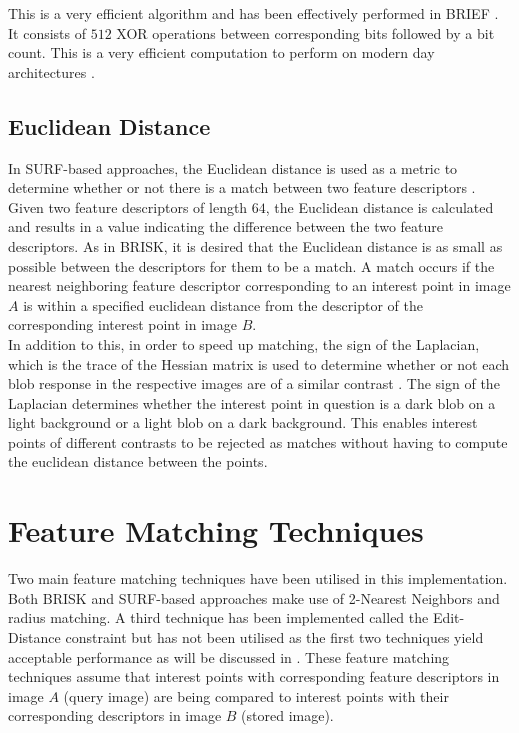 \documentclass{report}
\begin{document}
This is a very efficient algorithm and has been effectively performed in BRIEF \cite{Calonder}. It consists of $512$ XOR operations between corresponding bits followed by a bit count. This is a very efficient computation to perform on modern day architectures \cite{Leutenegger2011}. \\ 

\subsection{Euclidean Distance}
\label{sec:euclidean}
In SURF-based approaches,  the Euclidean distance is used as a metric to determine whether or not there is a match between two feature descriptors \cite{Lowe2004}. Given two feature descriptors of length $64$, the Euclidean distance is calculated and results in a value indicating the difference between the two feature descriptors. As in BRISK, it is desired that the Euclidean distance is as small as possible between the descriptors for them to be a match. A match occurs if the nearest neighboring feature descriptor corresponding to an interest point in image $A$ is within a specified euclidean distance from the descriptor of the corresponding interest point in image $B$.\\

In addition to this, in order to speed up matching, the sign of the Laplacian, which is the trace of the Hessian matrix is used to determine whether or not each blob response in the respective images are of a similar contrast \cite{Bay2008}. The sign of the Laplacian determines whether the interest point in question is a dark blob on a light background or a light blob on a dark background. This enables interest points of different contrasts to be rejected as matches without having to compute the euclidean distance between the points.\\

\section{Feature Matching Techniques}
\label{sec:matchingTechniques}
Two main feature matching techniques have been utilised in this implementation. Both BRISK and SURF-based approaches make use of 2-Nearest Neighbors and radius matching. A third technique has been implemented called the Edit-Distance constraint but has not been utilised as the first two techniques yield acceptable performance as will be discussed in . These feature matching techniques assume that interest points with corresponding feature descriptors in image $A$ (query image) are being compared to interest points with their corresponding descriptors in image $B$ (stored image). \\
\end{document}
